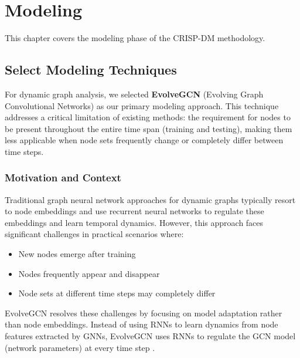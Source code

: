 
\chapter{Modeling}

This chapter covers the modeling phase of the CRISP-DM methodology.


\section{Select Modeling Techniques}

For dynamic graph analysis, we selected \textbf{EvolveGCN} (Evolving Graph Convolutional Networks) \cite{parejaEvolveGCNEvolvingGraph2020} as our primary modeling approach. This technique addresses a critical limitation of existing methods: the requirement for nodes to be present throughout the entire time span (training and testing), making them less applicable when node sets frequently change or completely differ between time steps.

\subsection*{Motivation and Context}

Traditional graph neural network approaches for dynamic graphs typically resort to node embeddings and use recurrent neural networks to regulate these embeddings and learn temporal dynamics. However, this approach faces significant challenges in practical scenarios where:

\begin{itemize}
	\item New nodes emerge after training
	\item Nodes frequently appear and disappear
	\item Node sets at different time steps may completely differ
\end{itemize}

EvolveGCN resolves these challenges by focusing on model adaptation rather than node embeddings. Instead of using RNNs to learn dynamics from node features extracted by GNNs, EvolveGCN uses RNNs to regulate the GCN model (network parameters) at every time step \cite{parejaEvolveGCNEvolvingGraph2020}. 

